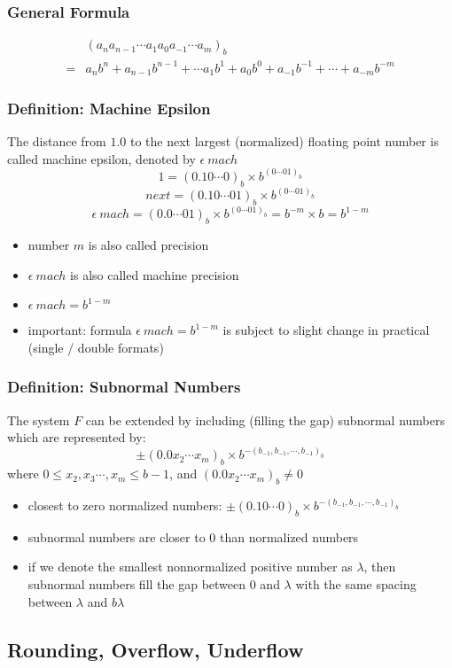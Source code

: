 \documentclass[11pt]{article}
\begin{document}
\subsubsection{General Formula}
\begin{align*}
  &(a_na_{n-1}\cdots a_1a_0a_{-1}\cdots a_m)_b \\
  = &a_nb^n + a_{n-1}b^{n-1} + \cdots a_1b^1 + a_0b^0 + a_{-1}b^{-1} + \cdots + a_{-m}b^{-m}
\end{align*}
\subsubsection{Definition: Machine Epsilon}
The distance from $1.0$ to the next largest (normalized) floating point number is called machine epsilon, denoted by $\epsilon\ mach$
\[1=(0.10\cdots0)_b\times b^{(0\cdots01)_b}\]
\[next=(0.10\cdots01)_b\times b^{(0\cdots01)_b}\]
\[\epsilon\ mach=(0.0\cdots01)_b\times b^{(0\cdots01)_b} = b^{-m}\times b = b^{1-m}\]
\begin{itemize}
  \item number $m$ is also called precision 
  \item $\epsilon\ mach$ is also called machine precision 
  \item $\epsilon\ mach = b^{1-m}$
  \item important: formula $\epsilon\ mach = b^{1-m}$ is subject to slight change in practical (single / double formats)
\end{itemize}
\subsubsection{Definition: Subnormal Numbers}
The system $F$ can be extended by including (filling the gap) subnormal numbers which are represented by:
\[\pm(0.0x_2\cdots x_m)_b\times b^{-(b_{-1},b_{-1},\cdots,b_{-1})_b}\]
where $0\leq x_2,x_3\cdots,x_m\leq b-1$, and $(0.0x_2\cdots x_m)_b\neq0$
\begin{itemize}
  \item closest to zero normalized numbers: $\pm(0.10\cdots0)_b\times b^{-(b_{-1},b_{-1},\cdots,b_{-1})_b}$
  \item subnormal numbers are closer to $0$ than normalized numbers 
  \item if we denote the smallest nonnormalized positive number as $\lambda$, then subnormal numbers fill the gap between $0$ and $\lambda$ with the same spacing between $\lambda$ and $b\lambda$
\end{itemize}
\subsection{Rounding, Overflow, Underflow}
\end{document}
